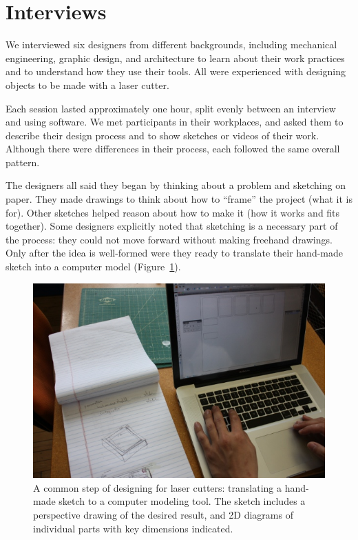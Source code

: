 \section{Interviews}
\label{sec:formative-interviews}

We interviewed six designers from different backgrounds, including
mechanical engineering, graphic design, and architecture to learn
about their work practices and to understand how they use their
tools. All were experienced with designing objects to be made with a
laser cutter.

Each session lasted approximately one hour, split evenly between an
interview and using software. We met participants in their workplaces,
and asked them to describe their design process and to show sketches
or videos of their work. Although there were differences in their
process, each followed the same overall pattern.

The designers all said they began by thinking about a problem and
sketching on paper. They made drawings to think about how to ``frame''
the project (what it is for). Other sketches helped reason about how
to make it (how it works and fits together). Some designers explicitly
noted that sketching is a necessary part of the process: they could
not move forward without making freehand drawings. Only after the idea
is well-formed were they ready to translate their hand-made sketch
into a computer model (Figure~\ref{fig:translate}).

\begin{figure}[h]
  \centering
  \includegraphics[width=0.7\linewidth]{img/translate-sketch-to-computer.jpg}
  \caption{A common step of designing for laser cutters: translating a
    hand-made sketch to a computer modeling tool. The sketch includes
    a perspective drawing of the desired result, and 2D diagrams of
    individual parts with key dimensions indicated.}
  \label{fig:translate}
\end{figure}

